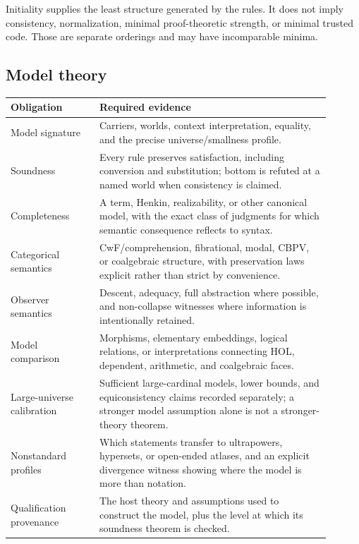 \documentclass[11pt]{article}
\theoremstyle{definition}
\theoremstyle{remark}
\begin{document}
Initiality supplies the least structure generated by the rules.  It does not
imply consistency, normalization, minimal proof-theoretic strength, or minimal
trusted code.  Those are separate orderings and may have incomparable minima.

\subsection{Model theory}

\begin{longtable}{>{\raggedright\arraybackslash}p{0.25\linewidth}%
                  >{\raggedright\arraybackslash}p{0.65\linewidth}}
\toprule
Obligation & Required evidence \\
\midrule
\endhead
Model signature & Carriers, worlds, context interpretation, equality, and the
  precise universe/smallness profile. \\
Soundness & Every rule preserves satisfaction, including conversion and
  substitution; bottom is refuted at a named world when consistency is claimed. \\
Completeness & A term, Henkin, realizability, or other canonical model, with the
  exact class of judgments for which semantic consequence reflects to syntax. \\
Categorical semantics & CwF/comprehension, fibrational, modal, CBPV, or
  coalgebraic structure, with preservation laws explicit rather than strict by
  convenience. \\
Observer semantics & Descent, adequacy, full abstraction where possible, and
  non-collapse witnesses where information is intentionally retained. \\
Model comparison & Morphisms, elementary embeddings, logical relations, or
  interpretations connecting HOL, dependent, arithmetic, and coalgebraic faces. \\
Large-universe calibration & Sufficient large-cardinal models, lower bounds,
  and equiconsistency claims recorded separately; a stronger model assumption
  alone is not a stronger-theory theorem. \\
Nonstandard profiles & Which statements transfer to ultrapowers, hypersets, or
  open-ended atlases, and an explicit divergence witness showing where the model
  is more than notation. \\
Qualification provenance & The host theory and assumptions used to construct the
  model, plus the level at which its soundness theorem is checked. \\
\bottomrule
\end{longtable}
\end{document}
